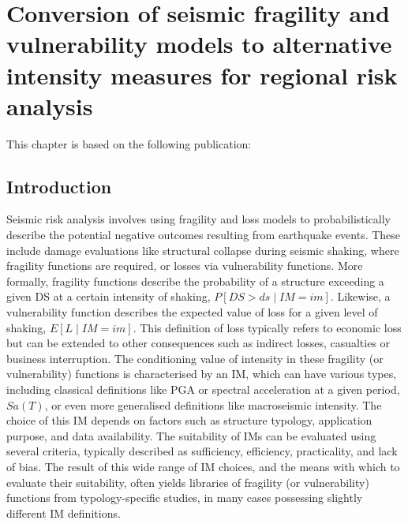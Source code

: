 \chapter{Conversion of seismic fragility and vulnerability models to alternative intensity measures for regional risk analysis}

This chapter is based on the following publication:
\begin{quote}
\end{quote}


\section{Introduction}
Seismic risk analysis involves using fragility and loss models to probabilistically describe the potential negative outcomes resulting from earthquake events. These include damage evaluations like structural collapse during seismic shaking, where fragility functions are required, or losses via vulnerability functions. More formally, fragility functions describe the probability of a structure exceeding a given \ac{DS} at a certain intensity of shaking, $P[DS>ds\mid IM=im]$. Likewise, a vulnerability function describes the expected value of loss for a given level of shaking, $E[L\mid IM=im]$. This definition of loss typically refers to economic loss but can be extended to other consequences such as indirect losses, casualties or business interruption. The conditioning value of intensity in these fragility (or vulnerability) functions is characterised by an \ac{IM}, which can have various types, including classical definitions like \ac{PGA} or spectral acceleration at a given period, $Sa(T)$, or even more generalised definitions like macroseismic intensity. The choice of this \ac{IM} depends on factors such as structure typology, application purpose, and data availability. The suitability of \acp{IM} can be evaluated using several criteria, typically described as sufficiency, efficiency, practicality, and lack of bias. The result of this wide range of \ac{IM} choices, and the means with which to evaluate their suitability, often yields libraries of fragility (or vulnerability) functions from typology-specific studies, in many cases possessing slightly different \ac{IM} definitions. 

